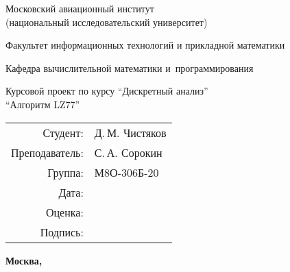 \begin{titlepage}
\begin{center}
\bfseries

{\Large Московский авиационный институт\\ (национальный исследовательский университет)

}

\vspace{48pt}

{\large Факультет информационных технологий и прикладной математики
}

\vspace{36pt}

{\large Кафедра вычислительной математики и~программирования

}


\vspace{48pt}

Курсовой проект по курсу \enquote{Дискретный анализ} \\
\enquote{Алгоритм LZ77}

\end{center}

\vspace{72pt}

\begin{flushright}
\begin{tabular}{rl}
Студент: & Д.\,М. Чистяков \\
Преподаватель: & С.\,А. Сорокин \\
Группа: & М8О-306Б-20 \\
Дата: & \\
Оценка: & \\
Подпись: & \\
\end{tabular}
\end{flushright}

\vfill

\begin{center}
\bfseries
Москва, \the\year
\end{center}
\end{titlepage}

\pagebreak